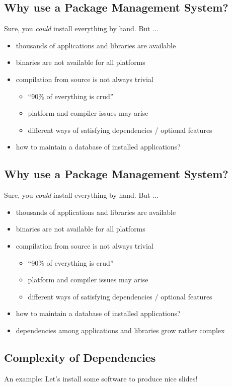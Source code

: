 \documentclass[xga]{xdvislides}
\begin{document}
\subsection{Why use a Package Management System?}
Sure, you {\em could} install everything by hand.  But ...
\begin{itemize}
	\item thousands of applications and libraries are available
	\item binaries are not available for all platforms
	\item compilation from source is not always trivial
		\begin{itemize}
			\item ``90\% of everything is crud''
			\item platform and compiler issues may arise
			\item different ways of satisfying dependencies / optional
				features
		\end{itemize}
	\item how to maintain a database of installed applications?
\end{itemize}

\subsection{Why use a Package Management System?}
Sure, you {\em could} install everything by hand.  But ...
\begin{itemize}
	\item thousands of applications and libraries are available
	\item binaries are not available for all platforms
	\item compilation from source is not always trivial
		\begin{itemize}
			\item ``90\% of everything is crud''
			\item platform and compiler issues may arise
			\item different ways of satisfying dependencies / optional
				features
		\end{itemize}
	\item how to maintain a database of installed applications?
	\item dependencies among applications and libraries grow
		rather complex
\end{itemize}

\subsection{Complexity of Dependencies}
An example: Let's install some software to produce nice slides! \\
\end{document}
